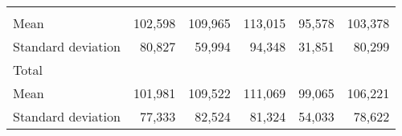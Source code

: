 \begin{tabular}{llllll}
  \multicolumn{1}{|r}{} &
  \multicolumn{1}{r}{} &
  \multicolumn{1}{r}{} &
  \multicolumn{1}{r}{} &
  \multicolumn{1}{r}{} \\
\multicolumn{1}{l}{\hspace{4em}Mean} &
  \multicolumn{1}{|r}{102,598} &
  \multicolumn{1}{r}{109,965} &
  \multicolumn{1}{r}{113,015} &
  \multicolumn{1}{r}{95,578} &
  \multicolumn{1}{r}{103,378} \\
\multicolumn{1}{l}{\hspace{4em}Standard deviation} &
  \multicolumn{1}{|r}{80,827} &
  \multicolumn{1}{r}{59,994} &
  \multicolumn{1}{r}{94,348} &
  \multicolumn{1}{r}{31,851} &
  \multicolumn{1}{r}{80,299} \\
\multicolumn{1}{l}{\hspace{3em}Total} &
  \multicolumn{1}{|r}{} &
  \multicolumn{1}{r}{} &
  \multicolumn{1}{r}{} &
  \multicolumn{1}{r}{} &
  \multicolumn{1}{r}{} \\
\multicolumn{1}{l}{\hspace{4em}Mean} &
  \multicolumn{1}{|r}{101,981} &
  \multicolumn{1}{r}{109,522} &
  \multicolumn{1}{r}{111,069} &
  \multicolumn{1}{r}{99,065} &
  \multicolumn{1}{r}{106,221} \\
\multicolumn{1}{l}{\hspace{4em}Standard deviation} &
  \multicolumn{1}{|r}{77,333} &
  \multicolumn{1}{r}{82,524} &
  \multicolumn{1}{r}{81,324} &
  \multicolumn{1}{r}{54,033} &
  \multicolumn{1}{r}{78,622} \\
\cline{1-6}
\end{tabular}

